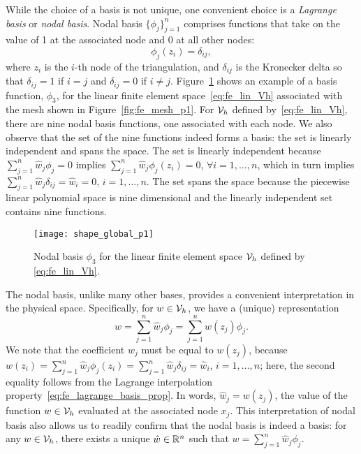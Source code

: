 While the choice of a basis is not unique, one convenient choice is a \emph{Lagrange basis} or \emph{nodal basis}.  Nodal basis $\{ \phi_j \}_{j=1}^n$ comprises functions that take on the value of 1 at the associated node and 0 at all other nodes:
\begin{equation}
  \phi_j(z_i) = \delta_{ij},
  \label{eq:fe_lagrange_basis_prop}
\end{equation}
where $z_i$ is the $i$-th node of the triangulation, and $\delta_{ij}$ is the Kronecker delta so that $\delta_{ij} = 1$ if $i = j$ and $\delta_{ij} = 0$ if $i \neq j$. Figure~\ref{fig:fe_shape_global_p1} shows an example of a basis function, $\phi_3$, for the linear finite element space~\eqref{eq:fe_lin_Vh} associated with the mesh shown in Figure~\ref{fig:fe_mesh_p1}.  For $\mathcal{V}_h$ defined by~\eqref{eq:fe_lin_Vh}, there are nine nodal basis functions, one associated with each node.  We also observe that the set of the nine functions indeed forms a basis: the set is linearly independent and spans the space. The set is linearly independent because $\sum_{j=1}^n \hat w_j \phi_j = 0$ implies $\sum_{j=1}^n \hat w_j \phi_j(z_i) = 0$, $\forall i =1,\dots,n$, which in turn implies $\sum_{j=1}^n \hat w_j \delta_{ij} = \hat w_i = 0$, $i = 1,\dots,n$.  The set spans the space because the piecewise linear polynomial space is nine dimensional and the linearly independent set contains nine functions.

\begin{figure}
  \centering
  \texttt{[image: shape\_global\_p1]}
  \caption{Nodal basis $\phi_3$ for the linear finite element space $\mathcal{V}_h$ defined by \eqref{eq:fe_lin_Vh}.}
  \label{fig:fe_shape_global_p1}
\end{figure}

The nodal basis, unlike many other bases, provides a convenient interpretation in the physical space.  Specifically, for $w \in \mathcal{V}_h$, we have a (unique) representation
\begin{equation}
  w = \sum_{j=1}^n \hat w_j \phi_j = \sum_{j=1}^n w(z_j) \phi_j.
  \label{eq:fe_rep}
\end{equation}
We note that the coefficient $\hat w_j$ must be equal to $w(z_j)$, because $w(z_i) = \sum_{j=1}^n \hat w_j \phi_j(z_i) = \sum_{j=1}^n \hat w_j \delta_{ij} = \hat w_i$, $i = 1,\dots,n$; here, the second equality follows from the Lagrange interpolation property~\eqref{eq:fe_lagrange_basis_prop}.  In words, $\hat w_j = w(z_j)$, the value of the function $w \in \mathcal{V}_h$ evaluated at the associated node $x_j$. This interpretation of nodal basis also allows us to readily confirm that the nodal basis is indeed a basis: for any $w \in \mathcal{V}_h$, there exists a unique $\hat w \in \mathbb{R}^n$ such that $w = \sum_{j=1}^n \hat w_j \phi_j$. %

